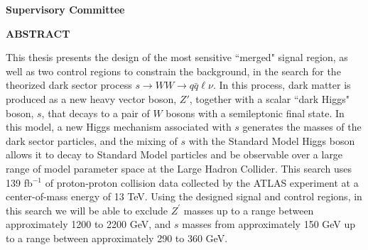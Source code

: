 \newpage
{}

\noindent \textbf{Supervisory Committee}
\tpbreak
\panel

\begin{center}
\textbf{ABSTRACT}
\end{center}

This thesis presents the design of the most sensitive ``merged" signal region, as well as two control regions to constrain the \ttbar background, in the search for the theorized dark sector process $s\rightarrow WW\rightarrow q\bar{q}\ell\nu$. In this process, dark matter is produced as a new heavy vector boson, $Z'$, together with a scalar ``dark Higgs" boson, $s$, that decays to a pair of $W$ bosons with a semileptonic final state. In this model, a new Higgs mechanism associated with $s$ generates the masses of the dark sector particles, and the mixing of $s$ with the Standard Model Higgs boson allows it to decay to Standard Model particles and be observable over a large range of model parameter space at the Large Hadron Collider. This search uses 139 fb$^{-1}$ of proton-proton collision data collected by the ATLAS experiment at a center-of-mass energy of 13 TeV.
Using the designed signal and control regions, in this search we will be able to exclude $Z^\prime$ masses up to a range between approximately 1200 to 2200 GeV, and $s$ masses from approximately 150 GeV up to a range between approximately 290 to 360 GeV.
